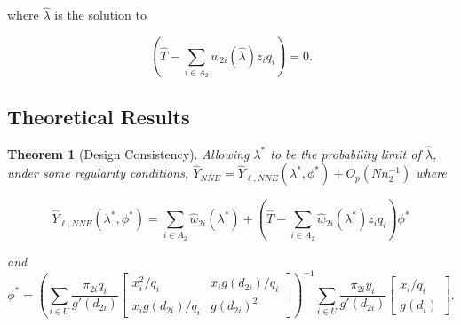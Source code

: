 \documentclass[12pt]{article}
\newtheorem{theorem}{Theorem}
\begin{document}
where $\hat \lambda$ is the solution to

\begin{equation}\label{eq:lamdc2}
  \left( \hat T - \sum_{i \in A_2} w_{2i}(\hat \lambda) z_i q_i\right) = 0.
\end{equation}

\subsection{Theoretical Results}

\begin{theorem}[Design Consistency]\label{thm:dc2}
  Allowing $\lambda^*$ to be the probability limit of $\hat \lambda$,
  under some regularity conditions, $\hat Y_{NNE} = \hat Y_{\ell, NNE}(\lambda^*,
  \phi^*) + O_p(Nn_2^{-1})$ where

  $$\hat Y_{\ell, NNE}(\lambda^*, \phi^*) = \sum_{i \in A_2} \hat w_{2i}(
  \lambda^*) + \left(\hat T - \sum_{i \in A_2} \hat w_{2i}(\lambda^*) z_i q_i\right)
  \phi^*$$

  and 
  $$\phi^* =
  \left(\sum_{i \in U} \frac{\pi_{2i} q_i}{g'(d_{2i})} 
  \begin{bmatrix}
    x_i^2 / q_i & x_i g(d_{2i}) / q_i \\
    x_i g(d_{2i}) / q_i & g(d_{2i})^2
  \end{bmatrix}
  \right)^{-1}
  \sum_{i \in U} \frac{\pi_{2i} y_i}{g'(d_{2i})} 
  \begin{bmatrix} x_i / q_i \\ g(d_i) \end{bmatrix}.
  $$
\end{theorem}
\end{document}
